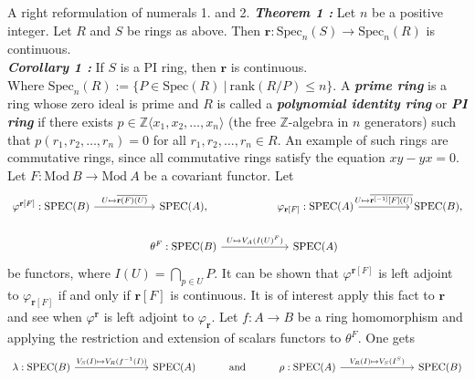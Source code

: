 \documentclass[final]{beamer}
\newlength{\colwidth}
\newcommand{\spec}{\mathrm{Spec}}
\newcommand{\SPEC}{\mathrm{SPEC}}
\newcommand{\Mod}[1]{\mathrm{Mod}~#1}
\newcommand{\Z}{\mathbb{Z}}
\newcommand{\defi}[1]{\textbf{\textsl{#1}}}
\begin{document}
\begin{frame}[t, fragile]
\begin{columns}[t]
\begin{column}{\colwidth}
\begin{block}{A right reformulation of numerals 1. and 2.}
    \vspace{0.5cm}\defi{Theorem 1 \textbf{\cite{Letzter}}:} Let $n$ be a positive integer. Let $R$ and $S$ be rings as above. Then $\mathbf{r}:\spec_n(S)\to\spec_n(R)$ is continuous.\\
    \vspace{0.5cm}\defi{Corollary 1 \textbf{\cite{Letzter}}:} If $S$ is a PI ring, then $\mathbf{r}$ is continuous. \\
    \vspace{0.5cm} Where $\spec_n(R):=\{P\in\spec(R)~|~\mathrm{rank}(R/P)\leq n\}$. A \defi{prime ring} is a ring whose zero ideal is prime and $R$ is called a \defi{polynomial identity ring} or \defi{PI ring} if there exists $p\in \Z\langle x_1,x_2,\ldots,x_n\rangle$ (the free $\Z$-algebra in $n$ generators) such that $p(r_1,r_2,\ldots,r_n)=0$ for all $r_1,r_2,\ldots,r_n\in R$. An example of such rings are commutative rings, since all commutative rings satisfy the equation $xy-yx=0$. \\
    \vspace{0.5cm}Let $F:\Mod{B}\to\Mod{A}$ be a covariant functor. Let \begin{equation*}
        \begin{tikzcd}
            \varphi^{\mathbf{r}[F]}:\SPEC(B)\arrow{rr}{U\mapsto \overline{\mathbf{r}(F)(U)}} & &\SPEC(A), &&\varphi_{\mathbf{r}[F]}:\SPEC(A)\arrow{rr}{U\mapsto \overline{\mathbf{r}^{[-1]}[F](U)}} & &\SPEC(B),\\
            && \theta^F:\SPEC(B)\arrow{rr}{U\mapsto V_A(I(U)^F)} & &\SPEC(A)
        \end{tikzcd}
    \end{equation*}
    be functors, where $I(U)=\bigcap_{p\in U}P$. It can be shown that $\varphi^{\mathbf{r}[F]}$ is left adjoint to $\varphi_{\mathbf{r}[F]}$ if and only if $\mathbf{r}[F]$ is continuous. It is of interest apply this fact to $\mathbf{r}$ and see when $\varphi^{\mathbf{r}}$ is left adjoint to $\varphi_{\mathbf{r}}$. Let $f:A\to B$ be a ring homomorphism and applying the restriction and extension of scalars functors to $\theta^F$. One gets
    \begin{equation*}
        \begin{tikzcd}
            \lambda:\SPEC(B)\arrow{rrr}{V_S(I)\mapsto V_R(f^{-1}(I))} & &&\SPEC(A) &\text{and}&\rho:\SPEC(A)\arrow{rrr}{V_R(I)\mapsto V_S(I^S)} & &&\SPEC(B)
        \end{tikzcd}
    \end{equation*}

\end{block}
\end{column}
\end{columns}
\end{frame}
\end{document}
